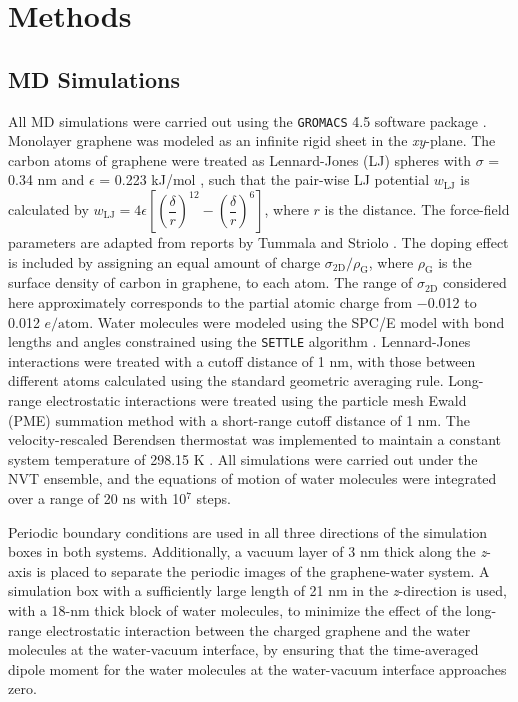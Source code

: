 \section{Methods}
\label{sec:wet-methods}

\subsection*{MD Simulations}
\label{sec:wet-md-simulations}


All MD simulations were carried out
using the \texttt{GROMACS} 4.5 software package
\cite{Hess_2008_gromacs}. Monolayer graphene was modeled as an
infinite rigid sheet in the \textit{xy}-plane.
%
The carbon atoms of graphene were treated as Lennard-Jones (LJ)
spheres with \(\sigma\) = 0.34 nm and \(\epsilon\) = 0.223 kJ/mol
\cite{Cheng_1990}, such that the pair-wise LJ potential
$w_{\mathrm{LJ}}$ is calculated by
\(w_{\mathrm{LJ}} = 4
\epsilon\left[\left(\dfrac{\delta}{r}\right)^{12} -
  \left(\dfrac{\delta}{r}\right)^{6}\right]\), where $r$ is the
distance.  The force-field parameters are adapted from reports by
Tummala and Striolo \cite{Tummala_2008_counterion_SDS}.
%
The doping effect is included by assigning an equal amount of charge
\(\sigma_{\mathrm{2D}} / \rho_{\mathrm{G}}\), where
\(\rho_{\mathrm{G}}\) is the surface density of carbon in graphene, to
each atom.
%
The range of \(\sigma_{\mathrm{2D}}\) considered here
approximately corresponds to the partial atomic charge from −0.012 to
0.012 \(e/\mathrm{atom}\).
%
Water molecules were modeled using the SPC/E model
\cite{Berendsen_1987_pair} with bond lengths and angles constrained
using the \texttt{SETTLE} algorithm
\cite{Miyamoto_1992_SHAKE_RATTLE}. Lennard-Jones interactions were
treated with a cutoff distance of 1 nm, with those between different
atoms calculated using the standard geometric averaging
rule. Long-range electrostatic interactions were treated using the
particle mesh Ewald (PME) summation method
\cite{Darden_1993_ewald,Essmann_1995_ewald} with a short-range cutoff
distance of 1 nm. The velocity-rescaled Berendsen thermostat was
implemented to maintain a constant system temperature of 298.15 K
\cite{Bussi_2007}. All simulations were carried out under the NVT
ensemble, and the equations of motion of water molecules were
integrated over a range of 20 ns with 10\(^{\text{7}}\) steps.

Periodic boundary conditions are used in all three directions of the
simulation boxes in both systems. Additionally, a vacuum layer of 3 nm
thick along the \emph{z}-axis is placed to separate the periodic
images of the graphene-water system. A simulation box with a
sufficiently large length of 21 nm in the \emph{z}-direction is used,
with a 18-nm thick block of water molecules, to minimize the effect of
the long-range electrostatic interaction between the charged graphene
and the water molecules at the water-vacuum interface, by ensuring
that the time-averaged dipole moment for the water molecules at the
water-vacuum interface approaches zero.





